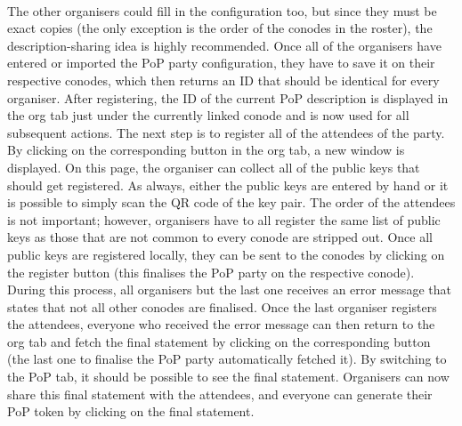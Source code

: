 \paragraph{}
The other organisers could fill in the configuration too, but since they must be exact copies (the only exception is the order of the conodes in the roster), the description-sharing idea is highly recommended. Once all of the organisers have entered or imported the PoP party configuration, they have to save it on their respective conodes, which then returns an ID that should be identical for every organiser. After registering, the ID of the current PoP description is displayed in the org tab just under the currently linked conode and is now used for all subsequent actions. The next step is to register all of the attendees of the party. By clicking on the corresponding button in the org tab, a new window is displayed. On this page, the organiser can collect all of the public keys that should get registered. As always, either the public keys are entered by hand or it is possible to simply scan the QR code of the key pair. The order of the attendees is not important; however, organisers have to all register the same list of public keys as those that are not common to every conode are stripped out. Once all public keys are registered locally, they can be sent to the conodes by clicking on the register button (this finalises the PoP party on the respective conode). During this process, all organisers but the last one receives an error message that states that not all other conodes are finalised. Once the last organiser registers the attendees, everyone who received the error message can then return to the org tab and fetch the final statement by clicking on the corresponding button (the last one to finalise the PoP party automatically fetched it). By switching to the PoP tab, it should be possible to see the final statement. Organisers can now share this final statement with the attendees, and everyone can generate their PoP token by clicking on the final statement.

